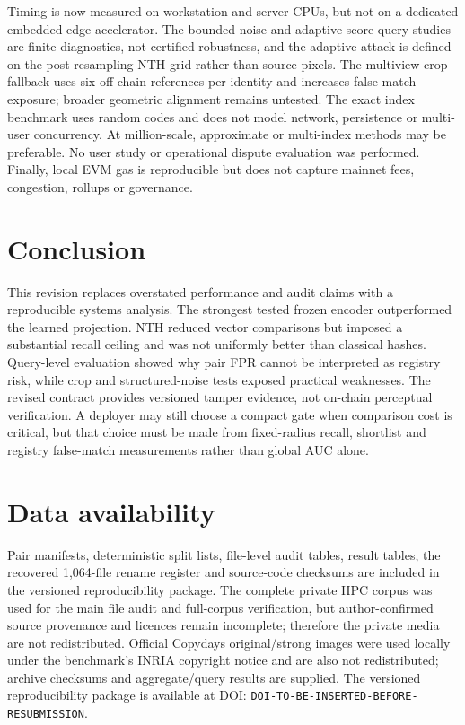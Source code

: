\documentclass[12pt]{article}
\newcommand{\RepositoryDOI}{DOI-TO-BE-INSERTED-BEFORE-RESUBMISSION}
\begin{document}
Timing is now measured on workstation and server CPUs, but not on a dedicated embedded edge accelerator. The bounded-noise and adaptive score-query studies are finite diagnostics, not certified robustness, and the adaptive attack is defined on the post-resampling NTH grid rather than source pixels. The multiview crop fallback uses six off-chain references per identity and increases false-match exposure; broader geometric alignment remains untested. The exact index benchmark uses random codes and does not model network, persistence or multi-user concurrency. At million-scale, approximate or multi-index methods may be preferable. No user study or operational dispute evaluation was performed. Finally, local EVM gas is reproducible but does not capture mainnet fees, congestion, rollups or governance.

\section{Conclusion}

This revision replaces overstated performance and audit claims with a reproducible systems analysis. The strongest tested frozen encoder outperformed the learned projection. NTH reduced vector comparisons but imposed a substantial recall ceiling and was not uniformly better than classical hashes. Query-level evaluation showed why pair FPR cannot be interpreted as registry risk, while crop and structured-noise tests exposed practical weaknesses. The revised contract provides versioned tamper evidence, not on-chain perceptual verification. A deployer may still choose a compact gate when comparison cost is critical, but that choice must be made from fixed-radius recall, shortlist and registry false-match measurements rather than global AUC alone.

\section*{Data availability}

Pair manifests, deterministic split lists, file-level audit tables, result tables, the recovered 1,064-file rename register and source-code checksums are included in the versioned reproducibility package. The complete private HPC corpus was used for the main file audit and full-corpus verification, but author-confirmed source provenance and licences remain incomplete; therefore the private media are not redistributed. Official Copydays original/strong images were used locally under the benchmark's INRIA copyright notice and are also not redistributed; archive checksums and aggregate/query results are supplied. The versioned reproducibility package is available at DOI: \texttt{\RepositoryDOI}.
\end{document}
